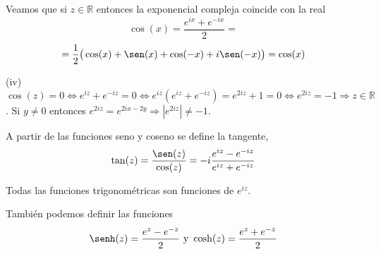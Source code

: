 \begin{dem}[ii]
  Veamos que si $z \in \mathbb{R}$ entonces la exponencial compleja coincide con la real \[\cos(x) = \frac{e^{ix} + e^{-ix}}{2} =\] \[= \frac{1}{2}\big( \cos(x) + \sen(x) + \cos(-x) + i \sen(-x) \big) = \cos(x) \]
\end{dem}

\begin{dem}(iv)
  $ \cos(z) = 0 \Leftrightarrow e^{iz} + e^{-iz} = 0 \Leftrightarrow e^{iz}(e^{iz} + e^{-iz}) = e^{2iz} +1 = 0 \Leftrightarrow e^{2iz} = -1 \Rightarrow z \in \mathbb{R}$. Si $ y \neq 0$ entonces $e^{2iz} = e^{2ix - 2y} \Rightarrow |e^{2iz}| \neq -1$.
\end{dem}

\begin{defn}
  A partir de las funciones seno y coseno se define la tangente, \[ \tan(z) = \frac{\sen(z)}{\cos(z)} = -i \frac{e^{iz} - e^{-iz}}{e^{iz} + e^{-iz}} \] 
\end{defn}

\begin{obs}
  Todas las funciones trigonométricas son funciones de $e^{iz}$.
\end{obs}

\begin{obs}
  También podemos definir las funciones \[ \senh(z) = \frac{e^{z}-e^{-z}}{2} \text{ y } \cosh(z) = \frac{e^{z} + e^{-z}}{2} \] 
\end{obs}
